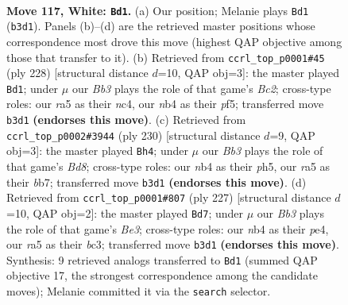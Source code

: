 \documentclass[11pt]{article}
\begin{document}
\clearpage

\begin{figure}[p]\centering
\begin{subfigure}{0.46\textwidth}\centering
\resizebox{\linewidth}{!}{%
\newchessgame
\chessboard[
  setfen={8/8/7k/r5p1/1n6/1B4K1/8/8 w - - 18 117},
  showmover=false,
  pgfstyle=straightmove, color=movearrow, markmove={b3-d1}
]}
\caption{}
\end{subfigure}\hfill
\begin{subfigure}{0.46\textwidth}\centering
\resizebox{\linewidth}{!}{%
\newchessgame
\chessboard[
  setfen={8/8/8/5pk1/2n2p2/8/2B2K2/8 w - - 40 115},
  showmover=false,
  pgfstyle=straightmove, color=movearrow, markmove={c2-d1}
]}
\caption{}
\end{subfigure}
\\[4pt]
\begin{subfigure}{0.46\textwidth}\centering
\resizebox{\linewidth}{!}{%
\newchessgame
\chessboard[
  setfen={3B4/1b6/8/5k1p/5p2/8/5K2/8 w - - 78 116},
  showmover=false,
  pgfstyle=straightmove, color=movearrow, markmove={d8-h4}
]}
\caption{}
\end{subfigure}\hfill
\begin{subfigure}{0.46\textwidth}\centering
\resizebox{\linewidth}{!}{%
\newchessgame
\chessboard[
  setfen={8/8/4b2k/8/4P3/2B2P2/5K2/8 b - - 52 114},
  showmover=false,
  pgfstyle=straightmove, color=movearrow, markmove={e6-d7}
]}
\caption{}
\end{subfigure}
\caption{\textbf{Move 117, White: \texttt{Bd1}.} (a) Our position; Melanie plays \texttt{Bd1} (\texttt{b3d1}). Panels (b)--(d) are the retrieved master positions whose correspondence most drove this move (highest QAP objective among those that transfer to it). (b) Retrieved from \texttt{ccrl\_top\_p0001\#45} (ply 228) [structural distance $d$=10, QAP obj=3]: the master played \texttt{Bd1}; under $\mu$ our \emph{Bb3} plays the role of that game's \emph{Bc2}; cross-type roles: our \emph{r}a5 as their \emph{n}c4, our \emph{n}b4 as their \emph{p}f5; transferred move \texttt{b3d1} \textbf{(endorses this move)}. (c) Retrieved from \texttt{ccrl\_top\_p0002\#3944} (ply 230) [structural distance $d$=9, QAP obj=3]: the master played \texttt{Bh4}; under $\mu$ our \emph{Bb3} plays the role of that game's \emph{Bd8}; cross-type roles: our \emph{n}b4 as their \emph{p}h5, our \emph{r}a5 as their \emph{b}b7; transferred move \texttt{b3d1} \textbf{(endorses this move)}. (d) Retrieved from \texttt{ccrl\_top\_p0001\#807} (ply 227) [structural distance $d$=10, QAP obj=2]: the master played \texttt{Bd7}; under $\mu$ our \emph{Bb3} plays the role of that game's \emph{Be3}; cross-type roles: our \emph{n}b4 as their \emph{p}e4, our \emph{r}a5 as their \emph{b}c3; transferred move \texttt{b3d1} \textbf{(endorses this move)}. Synthesis: 9 retrieved analogs transferred to \texttt{Bd1} (summed QAP objective 17, the strongest correspondence among the candidate moves); Melanie committed it via the \texttt{search} selector.}
\label{fig:thought-m232}
\end{figure}
\end{document}
